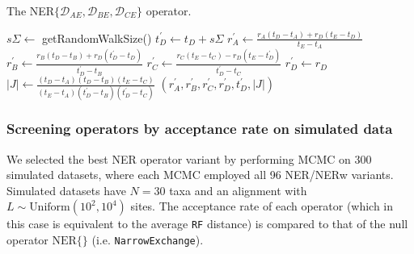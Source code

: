 \documentclass[10pt,letterpaper]{article}
\begin{document}
\begin{algorithm}
\caption{The NER$\{ \mathcal{D}_{AE}, \mathcal{D}_{BE}, \mathcal{D}_{CE} \}$ operator.}
\begin{algorithmic}[1]


	\State
    \State $s\Sigma \leftarrow $ getRandomWalkSize() 
    \State $t_D^\prime \leftarrow t_D + s\Sigma$ 
    \State
    \State $r_A^\prime \leftarrow \frac{r_A(t_D - t_A) + r_D(t_E - t_D)}{t_E - t_A}$ 
    \State $r_B^\prime \leftarrow \frac{r_B(t_D - t_B) + r_D(t_D^\prime - t_D)}{t_D^\prime - t_B}$
    \State $r_C^\prime \leftarrow \frac{r_C(t_E - t_C) - r_D(t_E - t_D^\prime)}{t_D^\prime - t_C}$
    \State $r_D^\prime \leftarrow r_D$
    \State
    \State $|J| \leftarrow \frac{(t_D - t_A)(t_D - t_B)(t_E - t_C)}{(t_E - t_A)(t_D^\prime - t_B)(t_D^\prime - t_C)}$ 
    \State \Return $(r_A^\prime, r_B^\prime, r_C^\prime, r_D^\prime, t_D^\prime, |J|)$
    
\EndProcedure

\end{algorithmic}
\label{alg:NER2}
\end{algorithm}






\subsubsection*{Screening operators by acceptance rate on simulated data}


We selected the best NER operator variant by performing MCMC on 300 simulated datasets, where each MCMC employed all 96 NER/NERw variants. 
Simulated datasets have $N=30$ taxa and an alignment with $L \sim \text{Uniform}(10^2, 10^4)$ sites. 
The acceptance rate of each operator (which in this case is equivalent to the average \texttt{RF} distance) is compared to that of the null operator $\text{NER}\{\}$ (i.e. \texttt{NarrowExchange}). 
\end{document}
